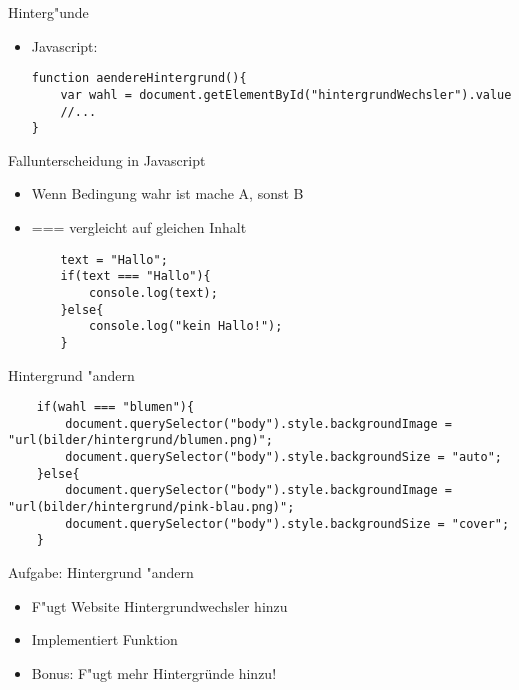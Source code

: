 \documentclass[18pt]{beamer}
\begin{document}
\begin{frame}[fragile]{Hinterg"unde}
\begin{itemize}
	\item Javascript:
	\begin{lstlisting}
function aendereHintergrund(){
	var wahl = document.getElementById("hintergrundWechsler").value
	//...
}
	\end{lstlisting}
	
\end{itemize}
\end{frame}

\begin{frame}[fragile]{Fallunterscheidung in Javascript}
\begin{itemize}
	\item \glqq Wenn Bedingung wahr ist mache A, sonst B\grqq
	\item === vergleicht auf gleichen Inhalt
	\begin{lstlisting}
	text = "Hallo";
	if(text === "Hallo"){
		console.log(text);
	}else{
		console.log("kein Hallo!");
	}
	\end{lstlisting}
\end{itemize}
\end{frame}

\begin{frame}[fragile]{Hintergrund "andern }
	\begin{lstlisting}
	if(wahl === "blumen"){
		document.querySelector("body").style.backgroundImage = "url(bilder/hintergrund/blumen.png)";
		document.querySelector("body").style.backgroundSize = "auto";
	}else{
		document.querySelector("body").style.backgroundImage = "url(bilder/hintergrund/pink-blau.png)";
		document.querySelector("body").style.backgroundSize = "cover";
	}
	\end{lstlisting}
\end{frame}


\begin{frame}[fragile]{Aufgabe: Hintergrund "andern }
\begin{itemize}
	\item F"ugt Website Hintergrundwechsler hinzu
	\item Implementiert Funktion
	\item Bonus: F"ugt mehr Hintergründe hinzu!
\end{itemize}
\end{frame}
\end{document}
